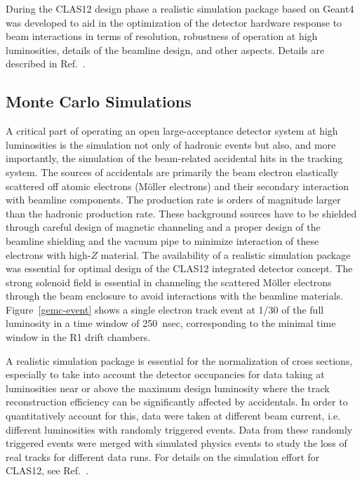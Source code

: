 \documentclass[final,3p,twocolumn]{elsarticle}
\begin{document}
During the CLAS12 design phase a realistic simulation package based on Geant4 was developed to aid in the optimization 
of the detector hardware response to beam interactions in terms of resolution, robustness of operation at high
luminosities, details of the beamline design, and other aspects.   Details are described in Ref.~\cite{Software}. 

\subsection{Monte Carlo Simulations} 

A critical part of operating an open large-acceptance detector system at high luminosities is the simulation not only of
hadronic events but also, and more importantly, the simulation of the beam-related accidental hits in the tracking system.
The sources of accidentals are primarily the beam electron elastically scattered off atomic electrons (M{\"o}ller electrons)
and their secondary interaction with beamline components. The production rate is orders of magnitude larger than the
hadronic production rate. These background sources have to be shielded through careful design of magnetic channeling and
a proper design of the beamline shielding and the vacuum pipe to minimize interaction of these electrons with high-$Z$
material. The availability of a realistic simulation package was essential for optimal design of the CLAS12 integrated detector
concept. The strong solenoid field is essential in channeling the scattered M{\"o}ller electrons through the beam enclosure
to avoid interactions with the beamline materials. Figure~\ref{gemc-event}  shows a single electron track event at 1/30 of
the full luminosity in a time window of 250~nsec, corresponding to the minimal time window in the R1 drift chambers. 
 
 A realistic simulation package is essential for the normalization of cross sections, especially to take into account the 
 detector occupancies for data taking at luminosities near or above the maximum design luminosity where the track 
 reconstruction efficiency can be significantly affected by accidentals. In order to quantitatively account for this, data
 were taken at different beam current, i.e. different luminosities with randomly triggered events. Data from these 
 randomly triggered events were merged with simulated physics events to study the loss of real tracks for different 
 data runs. For details on the simulation effort for CLAS12, see Ref.~\cite{GEMC}.    
\end{document}
